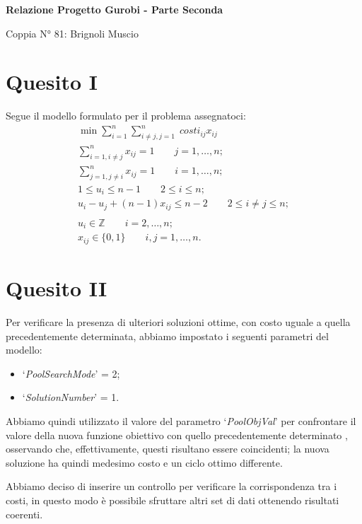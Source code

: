 \documentclass[12pt]{article}
\begin{document}
\begin{center}
	\Large\textbf{Relazione Progetto Gurobi - Parte Seconda}

	\small Coppia N° 81: Brignoli Muscio
\end{center}

\section*{Quesito I}
Segue il modello formulato per il problema assegnatoci:
\begin{gather*}
	\min\sum_{i=1}^n \sum_{i\neq j,j=1}^n\; costi_{ij}x_{ij}\\
	\sum_{i=1,i\neq j}^n x_{ij}=1\qquad j=1,\dots,n;\\
	\sum_{j=1,j\neq i}^n x_{ij}=1\qquad i=1,\dots,n;\\
	1\leq u_i\leq n-1\qquad 2\leq i\leq n;\\
	u_i-u_j+(n-1)x_{ij}\leq n-2\qquad 2\leq i\neq j\leq n;\\\\
	u_i\in\mathbb{Z}\qquad i=2,\dots,n;\\
	x_{ij}\in\{0,1\}\qquad i,j=1,\dots,n.
\end{gather*}

\section*{Quesito II}
Per verificare la presenza di ulteriori soluzioni ottime, con costo uguale a quella precedentemente determinata, abbiamo impostato i seguenti parametri del modello:
\begin{itemize}
	\item `\textit{PoolSearchMode}' = 2;
	\item `\textit{SolutionNumber}' = 1.
\end{itemize}

Abbiamo quindi utilizzato il valore del parametro `\textit{PoolObjVal}' per confrontare il valore della nuova funzione obiettivo con quello precedentemente determinato , osservando che, effettivamente, questi risultano essere coincidenti; la nuova soluzione ha quindi medesimo costo e un ciclo ottimo differente.

Abbiamo deciso di inserire un controllo per verificare la corrispondenza tra i costi, in questo modo è possibile sfruttare altri set di dati ottenendo risultati coerenti.
\end{document}

